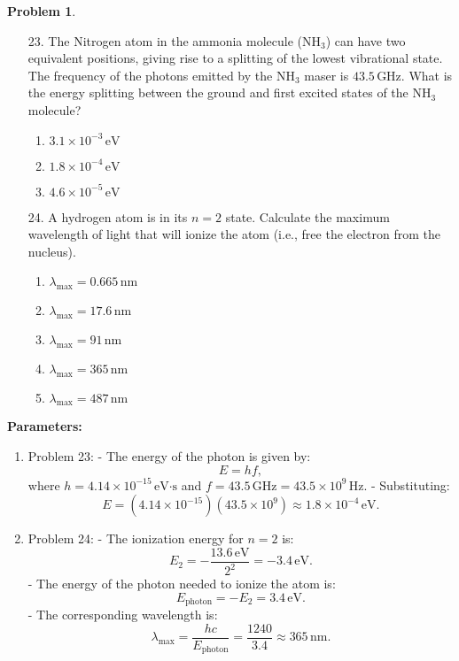 \documentclass[12pt]{article}
\theoremstyle{definition} %
\newtheorem{problem}{Problem}
\theoremstyle{plain} %
\begin{document}
\begin{problem}
    \begin{enumerate}
        \item[23.] The Nitrogen atom in the ammonia molecule (\(\text{NH}_3\)) can have two equivalent positions, giving rise to a splitting of the lowest vibrational state. The frequency of the photons emitted by the \(\text{NH}_3\) maser is \(43.5 \, \text{GHz}\). What is the energy splitting between the ground and first excited states of the \(\text{NH}_3\) molecule?
        \begin{enumerate}
            \item \(3.1 \times 10^{-3} \, \text{eV}\)
            \item \textbf{\(1.8 \times 10^{-4} \, \text{eV}\)}
            \item \(4.6 \times 10^{-5} \, \text{eV}\)
        \end{enumerate}
    
        \item[24.] A hydrogen atom is in its \(n = 2\) state. Calculate the maximum wavelength of light that will ionize the atom (i.e., free the electron from the nucleus).
        \begin{enumerate}
            \item \(\lambda_{\text{max}} = 0.665 \, \text{nm}\)
            \item \(\lambda_{\text{max}} = 17.6 \, \text{nm}\)
            \item \(\lambda_{\text{max}} = 91 \, \text{nm}\)
            \item \textbf{\(\lambda_{\text{max}} = 365 \, \text{nm}\)}
            \item \(\lambda_{\text{max}} = 487 \, \text{nm}\)
        \end{enumerate}
    \end{enumerate}
    
    \textbf{Parameters:}
    \begin{enumerate}
        \item Problem 23:
        - The energy of the photon is given by:
        $$
        E = h f,
        $$
        where \(h = 4.14 \times 10^{-15} \, \text{eV·s}\) and \(f = 43.5 \, \text{GHz} = 43.5 \times 10^9 \, \text{Hz}\).
        - Substituting:
        $$
        E = (4.14 \times 10^{-15})(43.5 \times 10^9) \approx 1.8 \times 10^{-4} \, \text{eV}.
        $$
    
        \item Problem 24:
        - The ionization energy for \(n = 2\) is:
        $$
        E_2 = -\frac{13.6 \, \text{eV}}{2^2} = -3.4 \, \text{eV}.
        $$
        - The energy of the photon needed to ionize the atom is:
        $$
        E_{\text{photon}} = -E_2 = 3.4 \, \text{eV}.
        $$
        - The corresponding wavelength is:
        $$
        \lambda_{\text{max}} = \frac{hc}{E_{\text{photon}}} = \frac{1240}{3.4} \approx 365 \, \text{nm}.
        $$
    \end{enumerate}
    

\end{problem}
\end{document}
